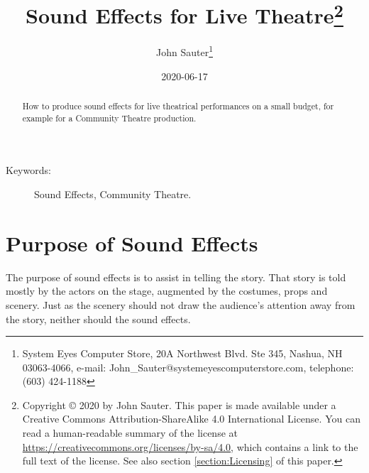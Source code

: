 \documentclass[letterpaper,twoside]{article}
\begin{document}
\title{Sound Effects for Live Theatre\footnote{Copyright
    {\copyright} 2020 by John Sauter.
    This paper is made available under a
    Creative Commons Attribution-ShareAlike 4.0 International License.
    You can read a human-readable summary of the license at
    \url{https://creativecommons.org/licenses/by-sa/4.0}, which contains
    a link to the full text of the license.
    See also section \ref{section:Licensing} of this paper.}
}
\author{John Sauter\footnote{
    System Eyes Computer Store,
    20A Northwest Blvd.  Ste 345,
    Nashua, NH  03063-4066,
    e-mail: John\_Sauter@systemeyescomputerstore.com,
    telephone: (603) 424-1188}}
\date{2020-06-17}
\maketitle
\begin{abstract}
  How to produce sound effects for live theatrical performances
  on a small budget,
  for example for a Community Theatre production.
\end{abstract}
\begin{description}
\item[Keywords:]Sound Effects, Community Theatre.
\end{description}
  
\newpage
\section{Purpose of Sound Effects}
The purpose of sound effects is to assist in telling the story.
That story is told mostly by the actors on the stage, augmented
by the costumes, props and scenery.  Just as the scenery should
not draw the audience's attention away from the story, neither
should the sound effects.
\end{document}
